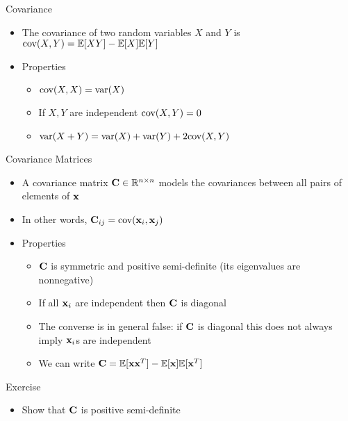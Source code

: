 \documentclass{beamer}
\begin{document}
\begin{frame}{Covariance}  
\begin{itemize}
 \item The covariance of two random variables $X$ and $Y$ is $\mbox{cov}(X, Y) = \mathbb{E}[XY] - \mathbb{E}[X]\mathbb{E}[Y]$ 
 \item Properties 
 \begin{itemize}
 \item $\mbox{cov}(X, X) = \mbox{var}(X)$ 
 \item If $X, Y$ are independent $\mbox{cov}(X, Y) = 0$ 
 \item $\mbox{var}(X + Y) = \mbox{var}(X) + \mbox{var}(Y) + 2\mbox{cov}(X, Y)$ 
 \end{itemize} 
\end{itemize}
\end{frame}

\begin{frame}{Covariance Matrices} 
\begin{itemize} 
 \item A covariance matrix $\textbf{C} \in \mathbb{R}^{n \times n}$ models the covariances between all pairs of elements of $\textbf{x}$
 \item In other words, $\textbf{C}_{ij} = \mbox{cov}(\textbf{x}_i, \textbf{x}_j)$
 \item Properties 
 \begin{itemize}
 \item $\textbf{C}$ is symmetric and positive semi-definite (its eigenvalues are nonnegative) 
 \item If all $\textbf{x}_i$ are independent then $\textbf{C}$ is diagonal 
 \item The converse is in general false: if $\textbf{C}$ is diagonal this does not always imply $\textbf{x}_i$s are independent 
 \item We can write $\textbf{C} = \mathbb{E}[\textbf{x}\textbf{x}^T] - \mathbb{E}[\textbf{x}]\mathbb{E}[\textbf{x}^T]$
 \end{itemize} 
\end{itemize}
\end{frame}

\begin{frame}{Exercise}  
\begin{itemize} 
 \item Show that $\textbf{C}$ is positive semi-definite 
\end{itemize} 
\end{frame}
\end{document}
